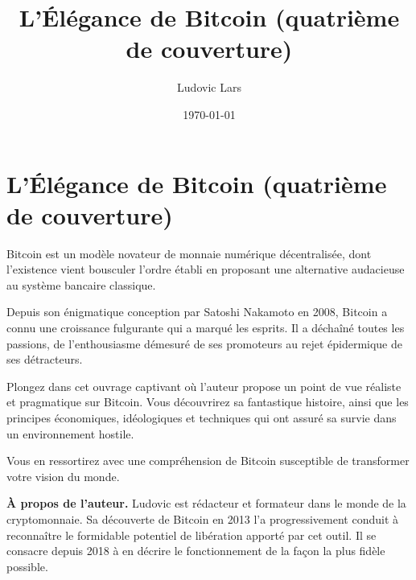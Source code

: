 \documentclass[a5paper, 11pt]{article}
\title{L'Élégance de Bitcoin (quatrième de couverture)}     %
\author{Ludovic Lars}                       %
\date{\today}                               %
\begin{document}
\section*{L'Élégance de Bitcoin (quatrième de couverture)}
\thispagestyle{empty}

Bitcoin est un modèle novateur de monnaie numérique décentralisée, dont l'existence vient bousculer l'ordre établi en proposant une alternative audacieuse au système bancaire classique.

Depuis son énigmatique conception par Satoshi Nakamoto en 2008, Bitcoin a connu une croissance fulgurante qui a marqué les esprits. Il a déchaîné toutes les passions, de l'enthousiasme démesuré de ses promoteurs au rejet épidermique de ses détracteurs.

Plongez dans cet ouvrage captivant où l'auteur propose un point de vue réaliste et pragmatique sur Bitcoin. Vous découvrirez sa fantastique histoire, ainsi que les principes économiques, idéologiques et techniques qui ont assuré sa survie dans un environnement hostile.

Vous en ressortirez avec une compréhension de Bitcoin susceptible de transformer votre vision du monde.

\textbf{À propos de l'auteur.} Ludovic est rédacteur et formateur dans le monde de la cryptomonnaie. Sa découverte de Bitcoin en 2013 l'a progressivement conduit à reconnaître le formidable potentiel de libération apporté par cet outil. Il se consacre depuis 2018 à en décrire le fonctionnement de la façon la plus fidèle possible.
\end{document}
